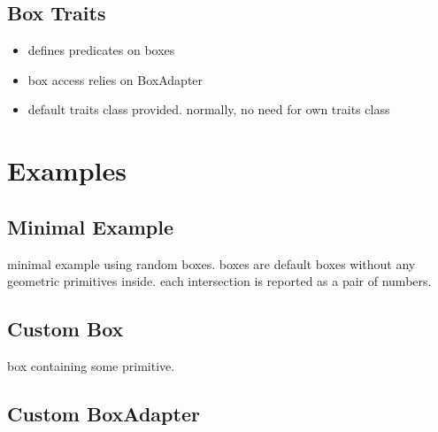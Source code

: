 \subsection*{Box Traits}
\begin{itemize}
\item defines predicates on boxes
\item box access relies on BoxAdapter
\item default traits class provided. normally, no need for own traits class

\end{itemize}
 
\section*{Examples}
\subsection*{Minimal Example}
minimal example using random boxes. boxes are default boxes without any geometric primitives inside. each intersection is reported as a pair of numbers. 

\subsection*{Custom Box}
box containing some primitive.

\subsection*{Custom BoxAdapter }



